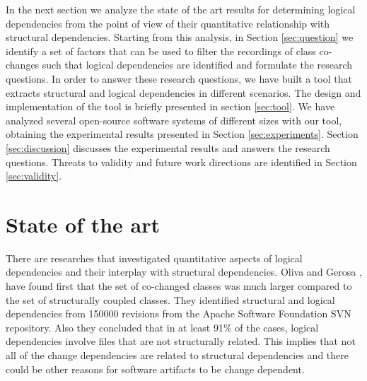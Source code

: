 \documentclass[a4paper,twoside]{article}
\begin{document}
In the next section we analyze the state of the art results for determining logical dependencies from the point of view of their quantitative relationship with structural dependencies. Starting from this analysis, in Section \ref{sec:question} we identify a set of factors that can be used to filter the recordings of class co-changes such that logical dependencies are identified and formulate the research questions. In order to answer these research questions, we have built a tool that extracts structural and logical dependencies in different scenarios. The design and implementation of the tool is briefly presented in section \ref{sec:tool}. We have analyzed several open-source software systems of different sizes with our tool, obtaining the experimental results presented in Section \ref{sec:experiments}. Section \ref{sec:discussion} discusses the experimental results and answers the research questions. Threats to validity and future work directions are identified in Section \ref{sec:validity}.
 


\section{State of the art}
\label{sec:state}


There are researches that investigated quantitative aspects of logical dependencies and their interplay with structural dependencies. 
Oliva and Gerosa \cite{Oliva:2011:ISL:2067853.2068086}, \cite{DBLP:conf/issre/OlivaG15} have found first that the set of co-changed classes was much larger compared to the set of structurally coupled classes. They identified structural and logical dependencies from 150000 revisions from the Apache Software Foundation SVN repository. Also they concluded  that in at least 91\% of the cases, logical dependencies involve files that are not structurally related. This implies that not all of the change dependencies are related to structural dependencies and there could be other reasons for software artifacts to be change dependent.
\end{document}
